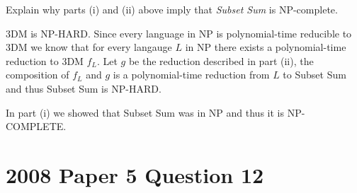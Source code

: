 \documentclass{supervision}
\begin{document}
\begin{questions}
\begin{parts}
\begin{subparts}
            \subpart[3] Explain why parts (i) and (ii) above imply that
              \emph{Subset Sum} is NP-complete.
              \begin{solution}
                3DM is NP-HARD. Since every language in NP is polynomial-time
                reducible to 3DM we know that for every langauge $L$ in NP there
                exists a polynomial-time reduction to 3DM $f_L$. Let $g$ be the
                reduction described in part (ii), the composition of $f_L$ and
                $g$ is a polynomial-time reduction from $L$ to Subset Sum and
                thus Subset Sum is NP-HARD.

                In part (i) we showed that Subset Sum was in NP and thus it is
                NP-COMPLETE.
              \end{solution}

          \end{subparts}
      \end{parts}

    \section*{2008 Paper 5 Question 12}
    \question
\end{questions}
\end{document}
